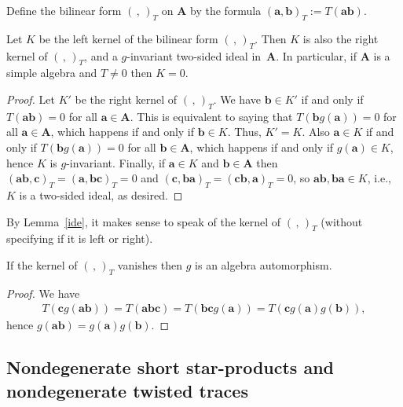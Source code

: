 Define the bilinear form $(\,,\,)_T$ on ${\mathbf A}$ by the formula $({\mathbf a},{\mathbf b})_T:=T({\mathbf a}{\mathbf b})$.

\begin{Lemma}\label{ide} Let $K$ be the left kernel of the bilinear form $(\,,\,)_T$. Then $K$ is also the right kernel of $(\,,\,)_T$, and a $g$-invariant two-sided ideal in~${{\mathbf A}}$. In particular, if ${\mathbf A}$ is a simple algebra and $T\ne 0$ then $K=0$.
\end{Lemma}

\begin{proof} Let $K'$ be the right kernel of $(\,,\,)_T$. We have ${\mathbf b}\in K'$ if and only if $T({\textbf{ab}})=0$ for all ${\mathbf a}\in {{\mathbf A}}$. This is equivalent to saying that $T({\mathbf b}g({\mathbf a}))=0$ for all ${\mathbf a}\in {{\mathbf A}}$, which happens if and only if ${\mathbf b}\in K$. Thus, $K'=K$. Also ${\mathbf a}\in K$ if and only if $T({\mathbf b}g({\mathbf a}))=0$ for all ${\mathbf b}\in {\mathbf A}$, which happens if and only if $g({\mathbf a})\in K$, hence $K$ is $g$-invariant. Finally, if ${\mathbf a}\in K$ and ${\mathbf b}\in {{\mathbf A}}$
then $({\textbf{ab}},{\textbf{c}})_T= ({\textbf{a}},{\textbf{bc}})_T=0$ and $({\textbf{c}},{\textbf{ba}})_T=({\textbf{cb}},{\textbf{a}})_T=0$, so ${\textbf{ab}},{\textbf{ba}}\in K$, i.e., $K$ is a two-sided ideal, as desired.
\end{proof}

By Lemma~\ref{ide}, it makes sense to speak of the kernel of $(\,,\,)_T$ (without specifying if it is left or right).

\begin{Lemma} If the kernel of $(\,,\,)_T$ vanishes then $g$ is an algebra automorphism.
\end{Lemma}

\begin{proof}We have
\begin{gather*}
T({\mathbf c}g({\mathbf a}{\mathbf b}))=T({\textbf{abc}})=T({\textbf{bc}}g({\mathbf a}))=T({\mathbf c}g({\mathbf a})g({\mathbf b})),
\end{gather*}
hence $g({\mathbf{ab}})=g({\mathbf a})g({\mathbf b})$.
\end{proof}

\subsection{Nondegenerate short star-products and nondegenerate twisted traces}

